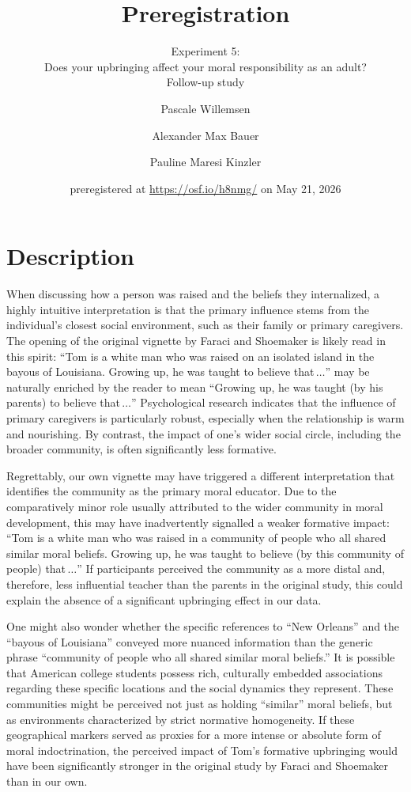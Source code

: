 \documentclass[scrarticle]{scrartcl}
\title{Preregistration}
\subtitle{Experiment 5:\\Does your upbringing affect your moral responsibility as an adult?\\Follow-up study}
\author[1]{Pascale Willemsen}
\author[2]{Alexander Max Bauer}
\author[1]{Pauline Maresi Kinzler }
\affil[1]{ University of Zurich}
\affil[2]{ Carl von Ossietzky University of Oldenburg}
\date{\small preregistered at \url{https://osf.io/h8nmg/} on May 21, 2026}
\begin{document}
\maketitle


\clearpage
\section{Description}
When discussing how a person was raised and the beliefs they internalized, a highly intuitive interpretation is that the primary influence stems from the individual's closest social environment, such as their family or primary caregivers.
The opening of the original vignette by Faraci and Shoemaker is likely read in this spirit:
\enquote{Tom is a white man who was raised on an isolated island in the bayous of Louisiana.
Growing up, he was taught to believe that\,$\ldots$} may be naturally enriched by the reader to mean \enquote{Growing up, he was taught (by his parents) to believe that\,$\ldots$}
Psychological research indicates that the influence of primary caregivers is particularly robust, especially when the relationship is warm and nourishing.
By contrast, the impact of one's wider social circle, including the broader community, is often significantly less formative.

Regrettably, our own vignette may have triggered a different interpretation that identifies the community as the primary moral educator.
Due to the comparatively minor role usually attributed to the wider community in moral development, this may have inadvertently signalled a weaker formative impact:
\enquote{Tom is a white man who was raised in a community of people who all shared similar moral beliefs.
Growing up, he was taught to believe (by this community of people) that\,$\ldots$}
If participants perceived the community as a more distal and, therefore, less influential teacher than the parents in the original study, this could explain the absence of a significant upbringing effect in our data.

One might also wonder whether the specific references to \enquote{New Orleans} and the \enquote{bayous of Louisiana} conveyed more nuanced information than the generic phrase \enquote{community of people who all shared similar moral beliefs.}
It is possible that American college students possess rich, culturally embedded associations regarding these specific locations and the social dynamics they represent.
These communities might be perceived not just as holding \enquote{similar} moral beliefs, but as environments characterized by strict normative homogeneity.
If these geographical markers served as proxies for a more intense or absolute form of moral indoctrination, the perceived impact of Tom's formative upbringing would have been significantly stronger in the original study by Faraci and Shoemaker than in our own.
\end{document}
